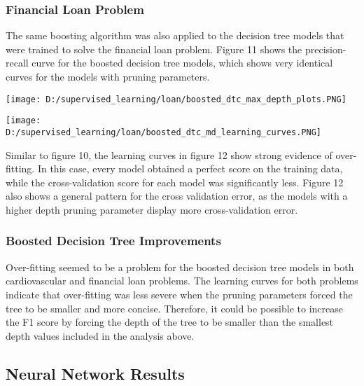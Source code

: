 \documentclass[10pt,journal,compsoc]{IEEEtran}
\begin{document}
\subsubsection{Financial Loan Problem}
The same boosting algorithm was also applied to the decision tree models that were trained to solve the financial loan problem. Figure 11 shows the precision-recall curve for the boosted decision tree models, which shows very identical curves for the models with pruning parameters. 
\begin{center}
	\texttt{[image: D:/supervised\_learning/loan/boosted\_dtc\_max\_depth\_plots.PNG]}
\end{center}
\begin{center}
	\texttt{[image: D:/supervised\_learning/loan/boosted\_dtc\_md\_learning\_curves.PNG]}
\end{center}

Similar to figure 10, the learning curves in figure 12 show strong evidence of over-fitting. In this case, every model obtained a perfect score on the training data, while the cross-validation score for each model was significantly less. Figure 12 also shows a general pattern for the cross validation error, as the models with a higher depth pruning parameter display more cross-validation error. 
\subsubsection{Boosted Decision Tree Improvements}
Over-fitting seemed to be a problem for the boosted decision tree models in both cardiovascular and financial loan problems. The learning curves for both problems indicate that over-fitting was less severe when the pruning parameters forced the tree to be smaller and more concise. Therefore, it could be possible to increase the F1 score by forcing the depth of the tree to be smaller than the smallest depth values included in the analysis above. 
\subsection{Neural Network Results}
\end{document}
